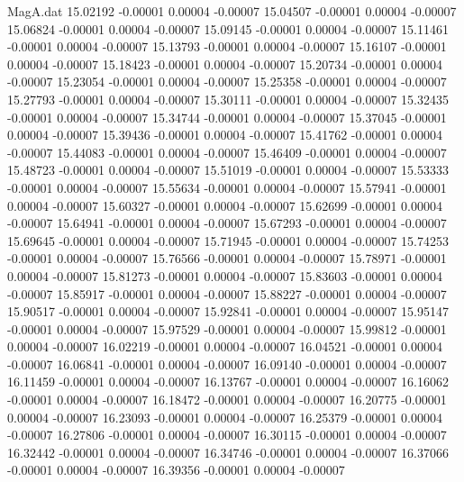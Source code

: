 \begin{filecontents}{MagA.dat}
  15.02192   -0.00001    0.00004   -0.00007
  15.04507   -0.00001    0.00004   -0.00007
  15.06824   -0.00001    0.00004   -0.00007
  15.09145   -0.00001    0.00004   -0.00007
  15.11461   -0.00001    0.00004   -0.00007
  15.13793   -0.00001    0.00004   -0.00007
  15.16107   -0.00001    0.00004   -0.00007
  15.18423   -0.00001    0.00004   -0.00007
  15.20734   -0.00001    0.00004   -0.00007
  15.23054   -0.00001    0.00004   -0.00007
  15.25358   -0.00001    0.00004   -0.00007
  15.27793   -0.00001    0.00004   -0.00007
  15.30111   -0.00001    0.00004   -0.00007
  15.32435   -0.00001    0.00004   -0.00007
  15.34744   -0.00001    0.00004   -0.00007
  15.37045   -0.00001    0.00004   -0.00007
  15.39436   -0.00001    0.00004   -0.00007
  15.41762   -0.00001    0.00004   -0.00007
  15.44083   -0.00001    0.00004   -0.00007
  15.46409   -0.00001    0.00004   -0.00007
  15.48723   -0.00001    0.00004   -0.00007
  15.51019   -0.00001    0.00004   -0.00007
  15.53333   -0.00001    0.00004   -0.00007
  15.55634   -0.00001    0.00004   -0.00007
  15.57941   -0.00001    0.00004   -0.00007
  15.60327   -0.00001    0.00004   -0.00007
  15.62699   -0.00001    0.00004   -0.00007
  15.64941   -0.00001    0.00004   -0.00007
  15.67293   -0.00001    0.00004   -0.00007
  15.69645   -0.00001    0.00004   -0.00007
  15.71945   -0.00001    0.00004   -0.00007
  15.74253   -0.00001    0.00004   -0.00007
  15.76566   -0.00001    0.00004   -0.00007
  15.78971   -0.00001    0.00004   -0.00007
  15.81273   -0.00001    0.00004   -0.00007
  15.83603   -0.00001    0.00004   -0.00007
  15.85917   -0.00001    0.00004   -0.00007
  15.88227   -0.00001    0.00004   -0.00007
  15.90517   -0.00001    0.00004   -0.00007
  15.92841   -0.00001    0.00004   -0.00007
  15.95147   -0.00001    0.00004   -0.00007
  15.97529   -0.00001    0.00004   -0.00007
  15.99812   -0.00001    0.00004   -0.00007
  16.02219   -0.00001    0.00004   -0.00007
  16.04521   -0.00001    0.00004   -0.00007
  16.06841   -0.00001    0.00004   -0.00007
  16.09140   -0.00001    0.00004   -0.00007
  16.11459   -0.00001    0.00004   -0.00007
  16.13767   -0.00001    0.00004   -0.00007
  16.16062   -0.00001    0.00004   -0.00007
  16.18472   -0.00001    0.00004   -0.00007
  16.20775   -0.00001    0.00004   -0.00007
  16.23093   -0.00001    0.00004   -0.00007
  16.25379   -0.00001    0.00004   -0.00007
  16.27806   -0.00001    0.00004   -0.00007
  16.30115   -0.00001    0.00004   -0.00007
  16.32442   -0.00001    0.00004   -0.00007
  16.34746   -0.00001    0.00004   -0.00007
  16.37066   -0.00001    0.00004   -0.00007
  16.39356   -0.00001    0.00004   -0.00007

\end{filecontents}

